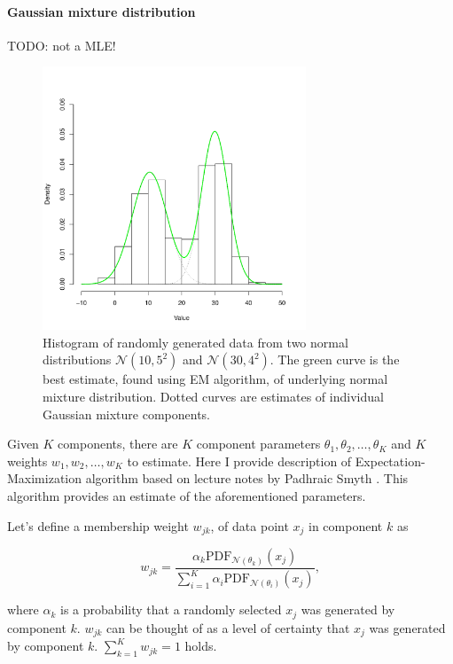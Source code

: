\documentclass[thesis=B,english]{FITthesis}[2012/06/26]
\begin{document}
\paragraph{Gaussian mixture distribution}
TODO: not a MLE!

\begin{figure}
	\centering
 	\includegraphics[width=0.7\textwidth]{gaussian_mixture_estimate}
 	\caption{Histogram of randomly generated data from two normal distributions $\mathcal{N}(10,5^2)$ and $\mathcal{N}(30,4^2)$. The green curve is the best estimate, found using EM algorithm, of underlying normal mixture distribution. Dotted curves are estimates of individual Gaussian mixture components.}
 	\label{fig:gaussian_mixture_est}
\end{figure}

Given $K$ components, there are $K$ component parameters $\theta_1, \theta_2, \dots, \theta_K$ and $K$ weights $w_1, w_2, \dots, w_K$ to estimate. Here I provide description of Expectation-Maximization algorithm based on lecture notes by Padhraic Smyth \cite{gaussian-mixture-em}. This algorithm provides an estimate of the aforementioned parameters.

Let's define a membership weight $w_{jk}$, of data point $x_j$ in component $k$ as

\begin{equation}
w_{jk} = \frac{\alpha_k \text{PDF}_{\mathcal{N}(\theta_k)}(x_j)}{\sum_{i=1}^K \alpha_i \text{PDF}_{\mathcal{N}(\theta_i)}(x_j)},
\end{equation}

where $\alpha_k$ is a probability that a randomly selected $x_j$ was generated by component $k$. $w_{jk}$ can be thought of as a level of certainty that $x_j$ was generated by component $k$. $\sum_{k=1}^K w_{jk} = 1$ holds.
\end{document}
